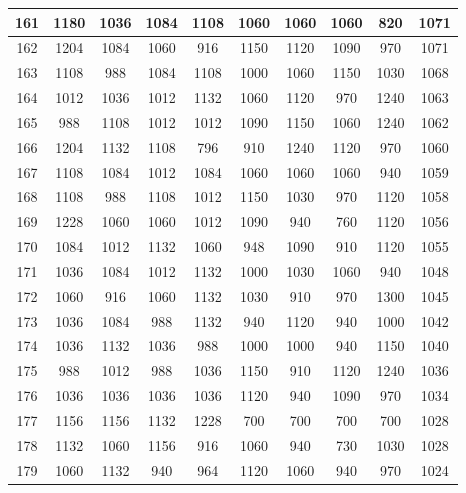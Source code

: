\documentclass{article}
\begin{document}
\begin{table}
\begin{tabular}{c|c|c|c|c|c|c|c|c|c|}
\multicolumn{1}{|c|}{161} & 1180 & 1036 & 1084 & 1108 & 1060 & 1060 & 1060 & 820  & 1071 \\ \hline
\multicolumn{1}{|c|}{162} & 1204 & 1084 & 1060 & 916  & 1150 & 1120 & 1090 & 970  & 1071 \\ \hline
\multicolumn{1}{|c|}{163} & 1108 & 988  & 1084 & 1108 & 1000 & 1060 & 1150 & 1030 & 1068 \\ \hline
\multicolumn{1}{|c|}{164} & 1012 & 1036 & 1012 & 1132 & 1060 & 1120 & 970  & 1240 & 1063 \\ \hline
\multicolumn{1}{|c|}{165} & 988  & 1108 & 1012 & 1012 & 1090 & 1150 & 1060 & 1240 & 1062 \\ \hline
\multicolumn{1}{|c|}{166} & 1204 & 1132 & 1108 & 796  & 910  & 1240 & 1120 & 970  & 1060 \\ \hline
\multicolumn{1}{|c|}{167} & 1108 & 1084 & 1012 & 1084 & 1060 & 1060 & 1060 & 940  & 1059 \\ \hline
\multicolumn{1}{|c|}{168} & 1108 & 988  & 1108 & 1012 & 1150 & 1030 & 970  & 1120 & 1058 \\ \hline
\multicolumn{1}{|c|}{169} & 1228 & 1060 & 1060 & 1012 & 1090 & 940  & 760  & 1120 & 1056 \\ \hline
\multicolumn{1}{|c|}{170} & 1084 & 1012 & 1132 & 1060 & 948  & 1090 & 910  & 1120 & 1055 \\ \hline
\multicolumn{1}{|c|}{171} & 1036 & 1084 & 1012 & 1132 & 1000 & 1030 & 1060 & 940  & 1048 \\ \hline
\multicolumn{1}{|c|}{172} & 1060 & 916  & 1060 & 1132 & 1030 & 910  & 970  & 1300 & 1045 \\ \hline
\multicolumn{1}{|c|}{173} & 1036 & 1084 & 988  & 1132 & 940  & 1120 & 940  & 1000 & 1042 \\ \hline
\multicolumn{1}{|c|}{174} & 1036 & 1132 & 1036 & 988  & 1000 & 1000 & 940  & 1150 & 1040 \\ \hline
\multicolumn{1}{|c|}{175} & 988  & 1012 & 988  & 1036 & 1150 & 910  & 1120 & 1240 & 1036 \\ \hline
\multicolumn{1}{|c|}{176} & 1036 & 1036 & 1036 & 1036 & 1120 & 940  & 1090 & 970  & 1034 \\ \hline
\multicolumn{1}{|c|}{177} & 1156 & 1156 & 1132 & 1228 & 700  & 700  & 700  & 700  & 1028 \\ \hline
\multicolumn{1}{|c|}{178} & 1132 & 1060 & 1156 & 916  & 1060 & 940  & 730  & 1030 & 1028 \\ \hline
\multicolumn{1}{|c|}{179} & 1060 & 1132 & 940  & 964  & 1120 & 1060 & 940  & 970  & 1024 \\ \hline

\end{tabular}
\end{table}
\end{document}
